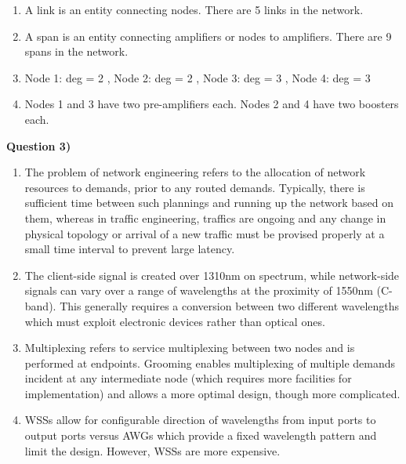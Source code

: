 \documentclass[10pt,letterpaper]{article}
\newcommand{\Q}[1]{\textbf{Question #1)}}
\begin{document}
\begin{enumerate}[label=\alph*)]
\item
A link is an entity connecting nodes. There are 5 links in the network.
\item
A span is an entity connecting amplifiers or nodes to amplifiers. There are 9 spans in the network.
\item
Node 1: deg = 2 , Node 2: deg = 2 , Node 3: deg = 3 , Node 4: deg = 3
\item
Nodes 1 and 3 have two pre-amplifiers each. Nodes 2 and 4 have two boosters each.
\end{enumerate}

%
%

\Q3

\begin{enumerate}[label=\alph*)]
\item
The problem of network engineering refers to the allocation of network resources to demands, prior to any routed demands. Typically, there is sufficient time between such plannings and running up the network based on them, whereas in traffic engineering, traffics are ongoing and any change in physical topology or arrival of a new traffic must be provised properly at a small time interval to prevent large latency.
\item
The client-side signal is created over 1310nm on spectrum, while network-side signals can vary over a range of wavelengths at the proximity of 1550nm (C-band). This generally requires a conversion between two different wavelengths which must exploit electronic devices rather than optical ones.
\item
Multiplexing refers to service multiplexing between two nodes and is performed at endpoints. Grooming enables multiplexing of multiple demands incident at any intermediate node (which requires more facilities for implementation) and allows a more optimal design, though more complicated.
\item
WSSs allow for configurable direction of wavelengths from input ports to output ports versus AWGs which provide a fixed wavelength pattern and limit the design. However, WSSs are more expensive.
\end{enumerate}
\end{document}
